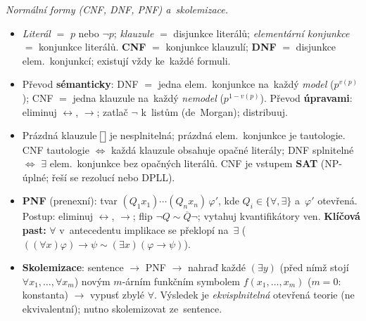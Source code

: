 \documentclass[11pt,a4paper]{article}
\newcommand{\eclause}{\mathord{\text{\framebox[1.25ex][c]{\rule{0pt}{0.95ex}}}}}
\begin{document}
\begin{poznamka}
\smallskip
\emph{Normální formy (CNF, DNF, PNF) a~skolemizace.}
\begin{itemize}
  \item \emph{Literál} $=$ $p$ nebo $\neg p$; \emph{klauzule} $=$ disjunkce literálů; \emph{elementární konjunkce} $=$ konjunkce literálů. \textbf{CNF} $=$ konjunkce klauzulí; \textbf{DNF} $=$ disjunkce elem.\ konjunkcí; existují vždy ke~každé formuli.
  \item Převod \textbf{sémanticky}: DNF $=$ jedna elem.\ konjunkce na~každý \emph{model} ($p^{v(p)}$); CNF $=$ jedna klauzule na~každý \emph{nemodel} ($p^{1-v(p)}$). Převod \textbf{úpravami}: eliminuj $\leftrightarrow$, $\to$; zatlač $\neg$ k~listům (de~Morgan); distribuuj.
  \item Prázdná klauzule $\eclause$ je nesplnitelná; prázdná elem.\ konjunkce je tautologie. CNF tautologie $\iff$ každá klauzule obsahuje opačné literály; DNF splnitelné $\iff$ $\exists$ elem.\ konjunkce bez opačných literálů. CNF je vstupem \textbf{SAT} (NP-úplné; řeší se rezolucí nebo DPLL).
  \item \textbf{PNF} (prenexní): tvar $(Q_1x_1)\cdots(Q_nx_n)\,\varphi'$, kde $Q_i\in\{\forall,\exists\}$ a~$\varphi'$ otevřená. Postup: eliminuj $\leftrightarrow$, $\to$; flip $\neg Q\sim\overline{Q}\neg$; vytahuj kvantifikátory ven. \textbf{Klíčová past:} $\forall$ v~antecedentu implikace se překlopí na~$\exists$ ($((\forall x)\varphi)\to\psi\sim(\exists x)(\varphi\to\psi)$).
  \item \textbf{Skolemizace}: sentence $\to$ PNF $\to$ nahraď každé $(\exists y)$ (před nímž stojí $\forall x_1,\dots,\forall x_m$) novým $m$-árním funkčním symbolem $f(x_1,\dots,x_m)$ ($m{=}0$: konstanta) $\to$ vypusť zbylé $\forall$. Výsledek je \emph{ekvisplnitelná} otevřená teorie (ne ekvivalentní); nutno skolemizovat ze~sentence.
\end{itemize}


\end{poznamka}
\end{document}

